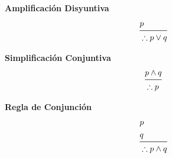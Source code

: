 \documentclass[12pt, fleqn]{report}                             %
\begin{document}
            \bigskip

            \begin{multicols}{2}
                
                \large{\textbf{Amplificación Disyuntiva}}
                    \begin{equation*}
                    \begin{split}
                        &p              \\
                        \midrule
                        &\therefore p \lor q
                    \end{split}
                    \end{equation*}

                \large{\textbf{Simplificación Conjuntiva}}
                    \begin{equation*}
                    \begin{split}
                        &p \land q      \\
                        \midrule
                        &\therefore p
                    \end{split}
                    \end{equation*}

            \end{multicols}



            \clearpage

            \large{\textbf{Regla de Conjunción}}
            \begin{equation*}
            \begin{split}
                &p                  \\
                &q                  \\
                \midrule
                &\therefore p \land q
            \end{split}
            \end{equation*}


            \bigskip
\end{document}
